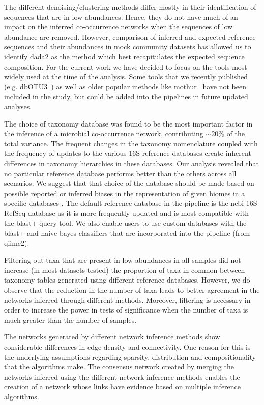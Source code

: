 The different denoising/clustering methods differ mostly in their identification of sequences that are in low abundances.
Hence, they do not have much of an impact on the inferred co-occurrence networks when the sequences of low abundance are removed.
However, comparison of inferred and expected reference sequences and their abundances in mock community datasets has allowed us to identify \ac{dada2} as the method which best recapitulates the expected sequence composition.
For the current work we have decided to focus on the tools most widely used at the time of the analysis. Some tools that we recently published (e.g. dbOTU3~\cite{Olesen2017}) as well as older popular methods like mothur~\cite{Schloss2009} have not been included in the study, but could be added into the pipelines in future updated analyses.

The choice of taxonomy database was found to be the most important factor in the inference of a microbial co-occurrence network, contributing $\sim20\%$ of the total variance.
The frequent changes in the taxonomy nomenclature coupled with the frequency of updates to the various 16S reference databases create inherent differences \cite{Balvociute2017} in taxonomy hierarchies in these databases.
Our analysis revealed that no particular reference database performs better than the others across all scenarios. We suggest that that choice of the database should be made based on possible reported or inferred biases in the representation of given biomes in a specific databases \cite{Balvociute2017}.
The default reference database in the pipeline is the \ac{ncbi} 16S RefSeq database as it is more frequently updated and is most compatible with the blast+ query tool.
We also enable users to use custom databases \cite{Ritari2015} with the blast+ and naive bayes classifiers that are incorporated into the pipeline (from \ac{qiime2}).

Filtering out taxa that are present in low abundances in all samples did not increase (in most datasets tested) the proportion of taxa in common between taxonomy tables generated using different reference databases.
However, we do observe that the reduction in the number of taxa leads to better agreement in the networks inferred through different methods.
Moreover, filtering is necessary in order to increase the power in tests of significance when the number of taxa is much greater than the number of samples.

The networks generated by different network inference methods show considerable differences in edge-density and connectivity.
One reason for this is the underlying assumptions regarding sparsity, distribution and compositionality that the algorithms make.
The consensus network created by merging the networks inferred using the different network inference methods enables the creation of a network whose links have evidence based on multiple inference algorithms.

